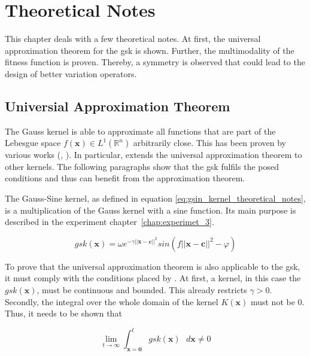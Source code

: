\documentclass[./\jobname.tex]{subfiles}
\begin{document}
\section{Theoretical Notes}
This chapter deals with a few theoretical notes. At first, the universal approximation theorem for the \gls{gsk} is shown. Further, the multimodality of the fitness function is proven. Thereby, a symmetry is observed that could lead to the design of better variation operators.  

\subsection{Universial Approximation Theorem}
\label{chap:gsin_approximation_theorem}

The Gauss kernel is able to approximate all functions that are part of the Lebesgue space $f(\mathbf{x}) \in L^1(\mathbb{R}^n)$ arbitrarily close. This has been proven by various works (\cite{park_universal_1991}, \cite{hangelbroek_nonlinear_2010}). In particular, \cite{park_universal_1991} extends the universal approximation theorem to other kernels. The following paragraphs show that the \gls{gsk} fulfils the posed conditions and thus can benefit from the approximation theorem. 

The Gauss-Sine kernel, as defined in equation \eqref{eq:gsin_kernel_theoretical_notes}, is a multiplication of the Gauss kernel with a sine function. Its main purpose is described in the experiment \mbox{chapter \ref{chap:experimet_3}}. 

\begin{equation}
\label{eq:gsin_kernel_theoretical_notes}
gsk(\mathbf{x}) = \omega e^{-\gamma ||\mathbf{x} - \mathbf{c}||^2} sin(f ||\mathbf{x} - \mathbf{c}||^2 - \varphi)
\end{equation}

To prove that the universal approximation theorem is also applicable to the \gls{gsk}, it must comply with the conditions placed by \cite{park_universal_1991}. At first, a kernel, in this case the $gsk(\mathbf{x})$, must be continuous and bounded. This already restricts $\gamma > 0$. Secondly, the integral over the whole domain of the kernel $K(\mathbf{x})$ must not be $0$. Thus, it needs to be shown that 

\begin{equation}
\lim_{t \to \infty} \int_{\mathbf{x} = \mathbf{0}}^{t} gsk(\mathbf{x}) \text{ } d\mathbf{x} \neq 0
\end{equation} 
\end{document}
